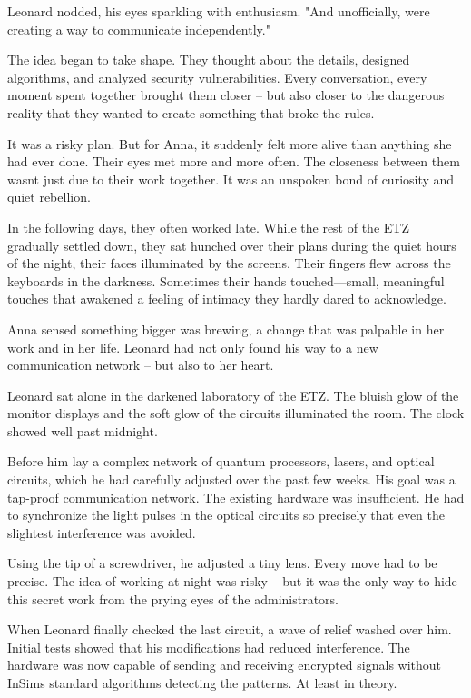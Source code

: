 \documentclass[
]{article}
\begin{document}
Leonard nodded, his eyes sparkling with enthusiasm. "And unofficially, we\textquotesingle re creating a way to communicate independently."

The idea began to take shape. They thought about the details, designed algorithms, and analyzed security vulnerabilities. Every conversation, every moment spent together brought them closer -- but also closer to the dangerous reality that they wanted to create something that broke the rules.

It was a risky plan. But for Anna, it suddenly felt more alive than anything she had ever done. Their eyes met more and more often. The closeness between them wasn\textquotesingle t just due to their work together. It was an unspoken bond of curiosity and quiet rebellion.

In the following days, they often worked late. While the rest of the ETZ gradually settled down, they sat hunched over their plans during the quiet hours of the night, their faces illuminated by the screens. Their fingers flew across the keyboards in the darkness. Sometimes their hands touched---small, meaningful touches that awakened a feeling of intimacy they hardly dared to acknowledge.

Anna sensed something bigger was brewing, a change that was palpable in her work and in her life. Leonard had not only found his way to a new communication network -- but also to her heart.

Leonard sat alone in the darkened laboratory of the ETZ. The bluish glow of the monitor displays and the soft glow of the circuits illuminated the room. The clock showed well past midnight.

Before him lay a complex network of quantum processors, lasers, and optical circuits, which he had carefully adjusted over the past few weeks. His goal was a tap-proof communication network. The existing hardware was insufficient. He had to synchronize the light pulses in the optical circuits so precisely that even the slightest interference was avoided.

Using the tip of a screwdriver, he adjusted a tiny lens. Every move had to be precise. The idea of \hspace{0pt}\hspace{0pt}working at night was risky -- but it was the only way to hide this secret work from the prying eyes of the administrators.

When Leonard finally checked the last circuit, a wave of relief washed over him. Initial tests showed that his modifications had reduced interference. The hardware was now capable of sending and receiving encrypted signals without InSim\textquotesingle s standard algorithms detecting the patterns. At least in theory.
\end{document}
